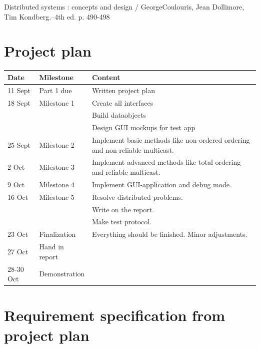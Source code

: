 \documentclass[a4paper,english]{article}
\begin{document}
\begin{thebibliography}{5}
 Distributed systems : concepts and design / GeorgeCoulouris, Jean Dollimore, Tim Kondberg.--4th ed. p. 490-498

\end{thebibliography}

\appendix
\section{Project plan} 
\label{app:projectplan}
\begin{tabular}{|l|l|p{7.5cm}|}
\hline
Date	&	Milestone	&	Content \\
\hline
11 Sept	&	Part 1 due	&	Written project plan \\
18 Sept &	Milestone 1 &	Create all interfaces \\ 
						&&	Build dataobjects \\
						&&	Design GUI mockups for test app \\
25 Sept &	Milestone 2 & 	Implement basic methods like non-ordered ordering and non-reliable multicast. \\
2 Oct	&	Milestone 3 & 	Implement advanced methods like total ordering and reliable multicast. \\
9 Oct	&	Milestone 4 & 	Implement GUI-application and debug mode. \\
16 Oct	&	Milestone 5 & 	Resolve distributed problems. \\ && Write on the report.\\ && Make test protocol. \\
23 Oct	&	Finalization 	& Everything should be finished. Minor adjustments. \\
27 Oct	&	Hand in report 	& \\
28-30 Oct & Demonstration	& \\
\hline
\end{tabular}

\section{Requirement specification from project plan}
\label{app:reqspec}
\end{document}
